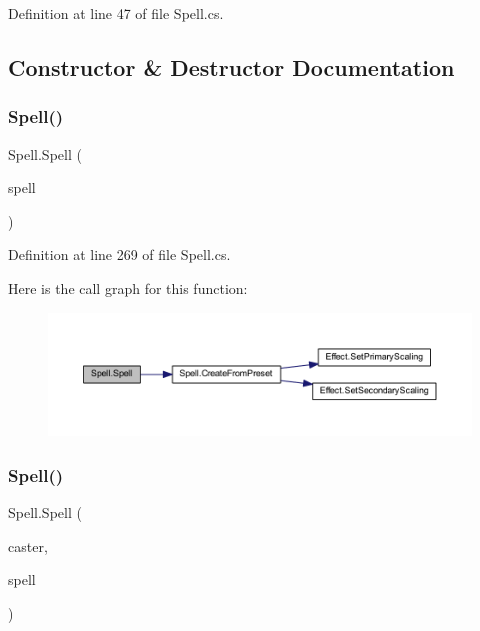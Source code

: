 Definition at line 47 of file Spell.\+cs.



\subsection{Constructor \& Destructor Documentation}
\mbox{\label{class_spell_a34acc5591bc0b3c8a1d9468e952be3c4}} 
\subsubsection{\texorpdfstring{Spell()}{Spell()}\hspace{0.1cm}{\footnotesize\ttfamily [1/2]}}
{\footnotesize\ttfamily Spell.\+Spell (\begin{DoxyParamCaption}\item[{\mbox{\hyperlink{class_spell_a5520e850e7000a6156b3456672b72ed1}{Preset}}}]{spell }\end{DoxyParamCaption})}



Definition at line 269 of file Spell.\+cs.

Here is the call graph for this function\+:
\nopagebreak
\begin{figure}[H]
\begin{center}
\leavevmode
\includegraphics[width=350pt]{class_spell_a34acc5591bc0b3c8a1d9468e952be3c4_cgraph}
\end{center}
\end{figure}
\mbox{\label{class_spell_a555a02d92d6de53a3b6d39bfda11c2cc}} 
\subsubsection{\texorpdfstring{Spell()}{Spell()}\hspace{0.1cm}{\footnotesize\ttfamily [2/2]}}
{\footnotesize\ttfamily Spell.\+Spell (\begin{DoxyParamCaption}\item[{\mbox{\hyperlink{class_base_unit}{Base\+Unit}}}]{caster,  }\item[{\mbox{\hyperlink{class_spell_a5520e850e7000a6156b3456672b72ed1}{Preset}}}]{spell }\end{DoxyParamCaption})}



